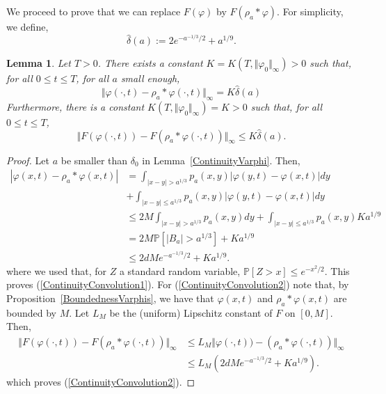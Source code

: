 \documentclass[a4paper,12pt]{article}
\newtheorem{lemma}[theorem]{Lemma}
\newcommand{\PP}{\mathbb{P}}
\newcommand{\1}{{\bf {1}}}
\begin{document}
We proceed to prove that we can replace $F(\varphi)$ by $F(\rho_a*\varphi)$. For simplicity, we define,
\[ \widehat{\delta}(a) := 2e^{-a^{-1/3}/2}+a^{1/9}. \]
\begin{lemma} \label{ContinuityConvolution}
Let $T>0$. There exists a constant $K=K(T,\Vert \varphi_0 \Vert_\infty)>0$ such that, for all $0 \leq t \leq T$, for all $a$ small enough,
\begin{equation} \label{ContinuityConvolution1} \Vert \varphi(\cdot,t) - \rho_a*\varphi(\cdot,t) \Vert_\infty = K \widehat{\delta}(a) \end{equation}
Furthermore, there is a constant $K(T, \Vert \varphi_0 \Vert_\infty) = K >0 $ such that, for all $0 \leq t \leq T$,
\begin{equation} \label{ContinuityConvolution2} \Vert F(\varphi(\cdot,t)) - F(\rho_a*\varphi(\cdot,t)) \Vert_\infty \leq K \widehat{\delta}(a). \end{equation}
\end{lemma}
\begin{proof}
Let $a$ be smaller than $\delta_0$ in Lemma~\ref{ContinuityVarphi}. Then,
\begin{align*}
|\varphi(x,t) - \rho_a*\varphi(x,t)| & = \int_{|x-y| > a^{1/3} } p_a(x,y)|\varphi(y,t)-\varphi(x,t)| dy  \\ & + \int_{|x-y| \leq a^{1/3} } p_a(x,y)|\varphi(y,t)-\varphi(x,t)| dy \\ & \leq 2 M \int_{|x-y| > a^{1/3}  } p_a(x,y) dy + \int_{|x-y| \leq a^{1/3}} p_a(x,y) K a^{1/9} \\ &= 2M \PP[|B_a| > a^{1/3}] + K a^{1/9} \\ & \leq  2 d M  e^{-a^{-1/3}/2} + Ka^{1/9}.
\end{align*}
where we used that, for $Z$ a standard random variable, $\PP[Z > x] \leq e^{-x^2/2}$. This proves (\ref{ContinuityConvolution1}). For (\ref{ContinuityConvolution2}) note that, by Proposition~\ref{BoundednessVarphis}, we have that $\varphi(x,t)$ and $\rho_a*\varphi(x,t)$ are bounded by $M$. Let $L_M$ be the (uniform) Lipschitz constant of $F$ on $[0,M]$. Then,
\begin{align*}
 \Vert F(\varphi(\cdot,t)) - F(\rho_a*\varphi(\cdot,t)) \Vert_\infty &\leq L_M \Vert \varphi(\cdot,t)) - (\rho_a*\varphi(\cdot,t)) \Vert_\infty \\ & \leq L_M ( 2 d M e^{-a^{-1/3}/2} + Ka^{1/9}).
\end{align*}
which proves (\ref{ContinuityConvolution2}). 
\end{proof}
\end{document}

